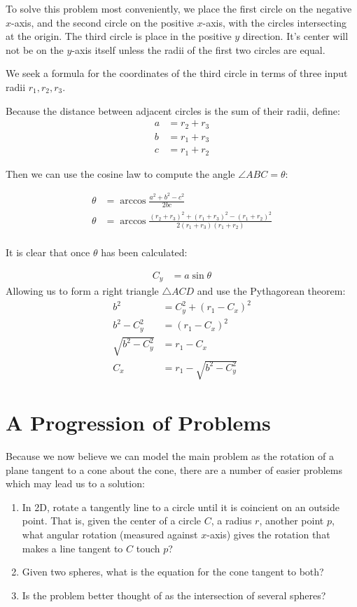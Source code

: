 \documentclass{article}
\begin{document}
To solve this problem most conveniently, we place the first circle on the negative $x$-axis, and the second circle
on the positive $x$-axis, with the circles intersecting at the origin.
The third circle is place in the positive $y$ direction. It's center will not be on the $y$-axis itself unless the
radii of the first two circles are equal.

We seek a formula for the coordinates of the third circle in terms of three input radii $r_1,r_2,r_3$.

Because the distance between adjacent circles is the sum of their radii, define:
\begin{align}
a  &= r_2 + r_3 \\
b  &= r_1 + r_3 \\
c  &= r_1 + r_2
\end{align}

Then we can use the cosine law to compute the angle $\angle ABC = \theta$:


\begin{align}
  \theta  &= \arccos{\frac{a^2 + b^2 - c^2}{2bc}} \\
  \theta  &= \arccos{\frac{(r_2+r_3)^2 + (r_1+r_3)^2 - (r_1+r_2)^2}{2(r_1+r_3)(r_1+r_2)}} \\
\end{align}

It is clear that once $\theta$ has been calculated:

\begin{align}
 C_y  &= a\sin{\theta}
\end{align}
Allowing us to form a right triangle $\triangle ACD$ and use the Pythagorean theorem:
\begin{align}
  b^2  &= C_y^2 + (r_1-C_x)^2 \\
  b^2 - C_y^2  &= (r_1-C_x)^2  \\
  \sqrt{b^2 - C_y^2}  &= r_1-C_x  \\
  C_x &= r_1 -  \sqrt{b^2 - C_y^2}
\end{align}

\section{A Progression of Problems}

Because we now believe we can model the main problem as the rotation of a plane tangent to a cone about the cone,
there are a number of easier problems which may lead us to a solution:
\begin{enumerate}
\item In 2D, rotate a tangently line to a circle until it is coincient on an outside point.  That is, given the
  center of a circle $C$, a radius $r$, another point $p$, what angular rotation (measured against $x$-axis) gives
  the rotation that makes a line tangent to $C$ touch $p$?
\item Given two spheres, what is the equation for the cone tangent to both?
  \item Is the problem better thought of as the intersection of several spheres?
  \end{enumerate}
\end{document}
